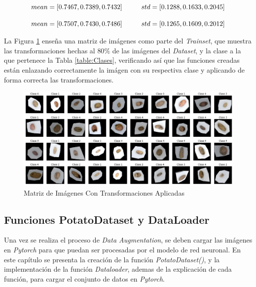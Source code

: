 \begin{equation}				{mean = [0.7467, 0.7389, 0.7432] \hspace*{1cm}  std  = [0.1288, 0.1633, 0.2045]}
	\label{eq:meanstd1}
\end{equation}


\begin{equation}
	{mean = [0.7507, 0.7430, 0.7486] \hspace*{1cm}  std  = [0.1265, 0.1609, 0.2012]}
	\label{eq:meanstd2}
\end{equation}

La Figura \ref{fig:agumentation} enseña una matriz de imágenes como parte del \textit{Trainset}, que muestra las transformaciones hechas al $80\%$ de las imágenes del \textit{Dataset}, y la clase a la que pertenece la Tabla \ref{table:Clases}, verificando así que las funciones creadas están enlazando correctamente la imágen con su respectiva clase y aplicando de forma correcta las transformaciones.


\begin{figure}[ht]
	\centering
	\includegraphics[scale=0.4]{Figs/augmentation.png}
	\caption{Matriz de Imágenes Con Transformaciones Aplicadas}
	\label{fig:agumentation}
\end{figure}	

\subsection{Funciones PotatoDataset y DataLoader}

Una vez se realiza el proceso de \textit{Data Augmentation}, se deben cargar las imágenes en \textit{Pytorch} para que puedan ser procesadas por el modelo de red neuronal. En este capítulo se presenta la creación de la función \textit{PotatoDataset()}, y la implementación de la función \textit{Dataloader}, ademas de la explicación de cada función, para cargar el conjunto de datos en \textit{Pytorch}.


